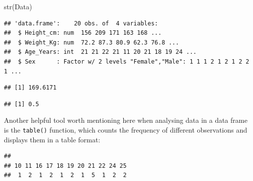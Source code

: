 \documentclass[
]{book}
\newenvironment{Shaded}{\begin{snugshade}}{\end{snugshade}}
\newcommand{\DecValTok}[1]{\textcolor[rgb]{0.00,0.00,0.81}{#1}}
\newcommand{\FunctionTok}[1]{\textcolor[rgb]{0.00,0.00,0.00}{#1}}
\newcommand{\NormalTok}[1]{#1}
\newcommand{\SpecialCharTok}[1]{\textcolor[rgb]{0.00,0.00,0.00}{#1}}
\theoremstyle{definition}
\theoremstyle{definition}
\theoremstyle{definition}
\theoremstyle{definition}
\theoremstyle{remark}
\begin{document}
\begin{Shaded}
\begin{Highlighting}[]
\FunctionTok{str}\NormalTok{(Data)}
\end{Highlighting}
\end{Shaded}

\begin{verbatim}
## 'data.frame':    20 obs. of  4 variables:
##  $ Height_cm: num  156 209 171 163 168 ...
##  $ Weight_Kg: num  72.2 87.3 80.9 62.3 76.8 ...
##  $ Age_Years: int  21 21 22 21 11 20 21 18 19 24 ...
##  $ Sex      : Factor w/ 2 levels "Female","Male": 1 1 1 2 1 2 1 2 2 1 ...
\end{verbatim}

\begin{Shaded}
\end{Shaded}

\begin{verbatim}
## [1] 169.6171
\end{verbatim}

\begin{Shaded}
\end{Shaded}

\begin{verbatim}
## [1] 0.5
\end{verbatim}

Another helpful tool worth mentioning here when analysing data in a data frame is the \texttt{table()} function, which counts the frequency of different observations and displays them in a table format:

\begin{Shaded}
\end{Shaded}

\begin{verbatim}
## 
## 10 11 16 17 18 19 20 21 22 24 25 
##  1  2  1  2  1  2  1  5  1  2  2
\end{verbatim}
\end{document}
